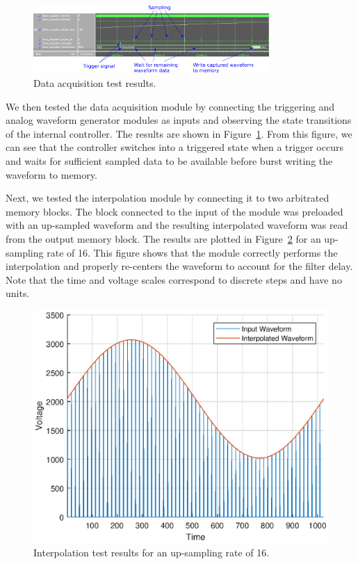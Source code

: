 \documentclass[journal,hidelinks]{IEEEtran}
\begin{document}
\begin{figure}[!htb]
  \centering
  \includegraphics[width=0.8\textwidth]{test-results/data_acquisition_test.png}
  \caption{Data acquisition test results.}
  \label{fig:data_acq_test}
\end{figure}

We then tested the data acquisition module by connecting the triggering and analog waveform generator modules as inputs and observing the state transitions of the internal controller. The results are shown in Figure~\ref{fig:data_acq_test}. From this figure, we can see that the controller switches into a triggered state when a trigger occurs and waits for sufficient sampled data to be available before burst writing the waveform to memory.

Next, we tested the interpolation module by connecting it to two arbitrated memory blocks. The block connected to the input of the module was preloaded with an up-sampled waveform and the resulting interpolated waveform was read from the output memory block. The results are plotted in Figure~\ref{fig:interpol_test} for an up-sampling rate of 16. This figure shows that the module correctly performs the interpolation and properly re-centers the waveform to account for the filter delay. Note that the time and voltage scales correspond to discrete steps and have no units.

\begin{figure}[!htb]
  \centering
  \includegraphics[width=\columnwidth]{test-results/interpolation.eps}
  \caption{Interpolation test results for an up-sampling rate of 16.}
  \label{fig:interpol_test}
\end{figure}
\end{document}
